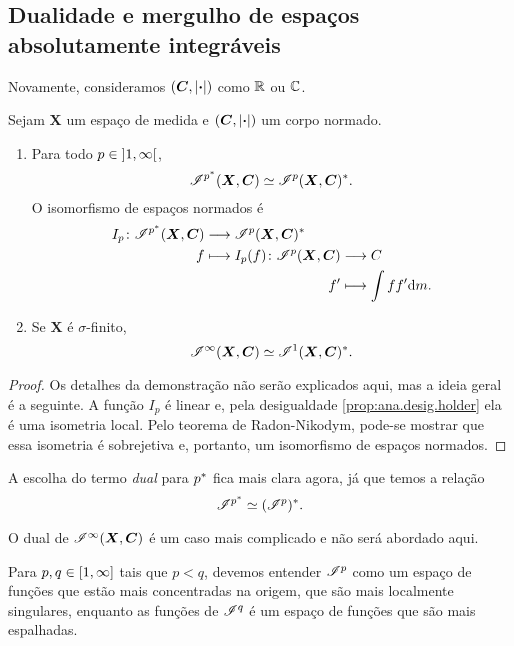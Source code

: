 \subsection{Dualidade e mergulho de espaços absolutamente integráveis}

Novamente, consideramos $(\bm C,\left\vert{\bm{\cdot}}\right\vert)$ como $\mathbb{R}$ ou $\mathbb{C}$.

\begin{proposition}
Sejam $\bm X$ um espaço de medida e $(\bm C,\left\vert{\bm{\cdot}}\right\vert)$ um corpo normado.
	\begin{enumerate}
	\item Para todo $p \in \left]1,\allowbreak \infty\right[$,
		\begin{equation*}
		\mathscr{I}^{p^{\ast}}(\bm X,\bm C) \simeq \mathscr{I}^p(\bm X,\bm C)^{\ast}.
		\end{equation*}
O isomorfismo de espaços normados é
		\begin{align*}
		\func{I_p}{\Intg^{p\dual}(\bm X,\bm C)}{\Intg^p(\bm X,\bm C)\dual}{f}{
			\begin{aligned}[t]
			\func{I_p(f)}{\Intg^p(\bm X,\bm C)}{C}{f'}{\int ff' \dd\med}.
			\end{aligned}
		}
		\end{align*}

	\item Se $\bm X$ é $\sigma$-finito,
		\begin{equation*}
		\mathscr{I}^\infty(\bm X,\bm C) \simeq \mathscr{I}^1(\bm X,\bm C)^{\ast}.
		\end{equation*}
	\end{enumerate}
\end{proposition}
\begin{proof}
Os detalhes da demonstração não serão explicados aqui, mas a ideia geral é a seguinte. A função $I_p$ é linear e, pela desigualdade \ref{prop:ana.desig.holder} ela é uma isometria local. Pelo teorema de Radon-Nikodym, pode-se mostrar que essa isometria é sobrejetiva e, portanto, um isomorfismo de espaços normados.
\end{proof}

A escolha do termo \textit{dual} para $p^{\ast}$ fica mais clara agora, já que temos a relação
	\begin{equation*}
	\mathscr{I}^{p^{\ast}} \simeq (\mathscr{I}^p)^{\ast}.
	\end{equation*}

O dual de $\mathscr{I}^\infty(\bm X,\bm C)$ é um caso mais complicado e não será abordado aqui.

Para $p,q \in \left[1,\allowbreak \infty\right]$ tais que $p < q$, devemos entender $\mathscr{I}^p$ como um espaço de funções que estão mais concentradas na origem, que são mais localmente singulares, enquanto as funções de $\mathscr{I}^q$ é um espaço de funções que são mais espalhadas.

